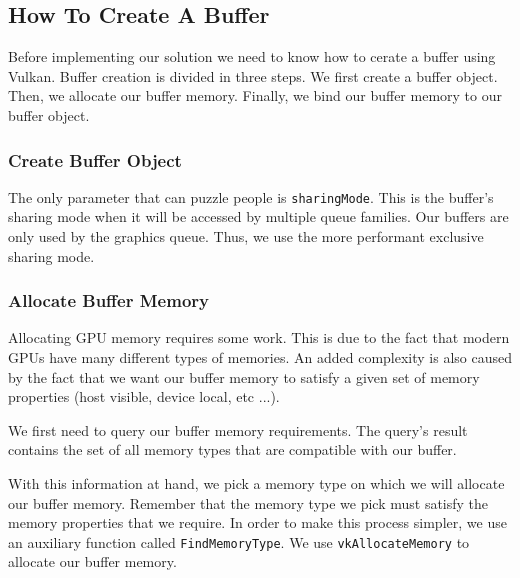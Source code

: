 \subsection{How To Create A Buffer}

Before implementing our solution we need to know how to cerate a buffer using Vulkan.
Buffer creation is divided in three steps.
We first create a buffer object.
Then, we allocate our buffer memory.
Finally, we bind our buffer memory to our buffer object.

\subsubsection{Create Buffer Object}

The only parameter that can puzzle people is \texttt{sharingMode}.
This is the buffer's sharing mode when it will be accessed by
multiple queue families.
Our buffers are only used by the graphics queue.
Thus, we use the more performant exclusive sharing mode.

\begin{minipage}{\linewidth}{\noindent}
    
\end{minipage}

\subsubsection{Allocate Buffer Memory}

Allocating GPU memory requires some work.
This is due to the fact that modern GPUs have many different types
of memories.
An added complexity is also caused by the fact that we
want our buffer memory to satisfy a given set of memory properties
(host visible, device local, etc ...).

\begin{minipage}{\linewidth}{\noindent}
    
\end{minipage}

We first need to query our buffer memory requirements.
The query's result contains the set of all memory types that are compatible
with our buffer.

With this information at hand, we pick a memory type on which we will
allocate our buffer memory.
Remember that the memory type we pick must satisfy the memory properties
that we require.
In order to make this process simpler, we use an auxiliary function
called \texttt{FindMemoryType}.
We use \texttt{vkAllocateMemory} to allocate our buffer memory.

